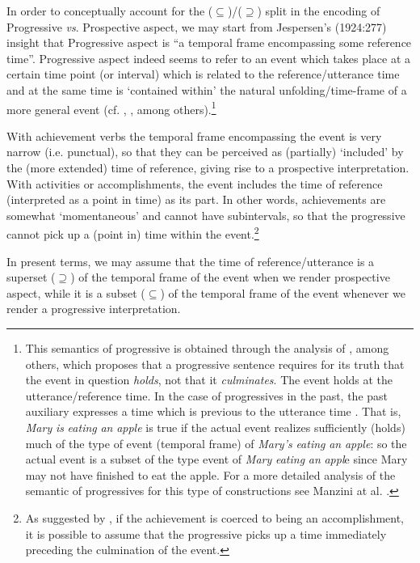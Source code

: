 \documentclass[output=paper]{langsci/langscibook}
\begin{document}
In order to conceptually account for the (${\subseteq}$)/(${\supseteq}$) split in the encoding of Progressive \textit{vs}. Prospective aspect, we may start from Jespersen’s (1924:277) insight that Progressive aspect is “a temporal frame encompassing some reference time”. Progressive aspect indeed seems to refer to an event which takes place at a certain time point (or interval) which is related to the reference/utterance time and at the same time is  ‘contained within’ the natural unfolding/time-frame of a more general event (cf. \citealt{Dowty1979}, \citealt{Higginbotham2004}, among others).\footnote{This semantics of progressive is obtained through the analysis of \citet{Higginbotham2009}, \citet{Parson1989} \citet{Landman1992} among others, which proposes that a progressive sentence requires for its truth that the event in question \textit{holds}, not that it \textit{culminates}. The event holds at the utterance/reference time. In the case of progressives in the past, the past auxiliary expresses a time which is previous to the utterance time \citep{Higginbotham2009}. That is, \textit{Mary} \textit{is} \textit{eating} \textit{an} \textit{apple} is true if the actual event realizes sufficiently (holds) much of the type of event (temporal frame) of \textit{Mary’s} \textit{eating} \textit{an} \textit{apple}: so the actual event is a subset of the type event of \textit{Mary} \textit{eating} \textit{an} \textit{appl}e since Mary may not have finished to eat the apple. For a more detailed analysis of the semantic of progressives for this type of constructions see Manzini at al. .} 

With achievement verbs the temporal frame encompassing the event is very narrow (i.e. punctual), so that they can be perceived as (partially) ‘included’ by the (more extended) time of reference, giving rise to a prospective interpretation. With activities or accomplishments, the event includes the time of reference (interpreted as a point in time) as its part. In other words, achievements are somewhat ‘momentaneous’ and cannot have subintervals, so that the progressive cannot pick up a (point in) time within the event.\footnote{As suggested by \citet{Rothstein2004}, if the achievement is coerced to being an accomplishment, it is possible to assume that the progressive picks up a time immediately preceding the culmination of the event.} 

In present terms, we may assume that the time of reference/utterance is a superset (${\supseteq}$) of the temporal frame of the event when we render prospective aspect, while it is a subset (${\subseteq}$) of the temporal frame of the event whenever we render a progressive interpretation.
\end{document}
